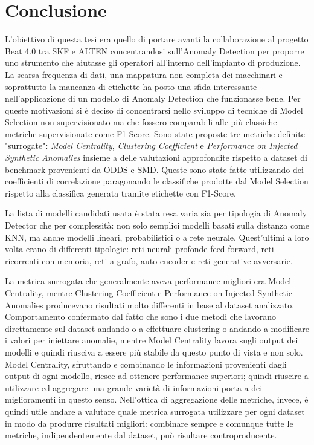 \chapter{Conclusione}
\label{chap:conclusion}
L'obiettivo di questa tesi era quello di portare avanti la collaborazione al progetto Beat 4.0 tra SKF e ALTEN concentrandosi sull'Anomaly Detection per proporre uno strumento che aiutasse gli operatori all'interno dell'impianto di produzione. La scarsa frequenza di dati, una mappatura non completa dei macchinari e soprattutto la mancanza di etichette ha posto una sfida interessante nell'applicazione di un modello di Anomaly Detection che funzionasse bene.
Per queste motivazioni si è deciso di concentrarsi nello sviluppo di tecniche di Model Selection non supervisionato ma che fossero comparabili alle più classiche metriche supervisionate come F1-Score.
Sono state proposte tre metriche definite "surrogate": \textit{Model Centrality}, \textit{Clustering Coefficient} e \textit{Performance on Injected Synthetic Anomalies} insieme a delle valutazioni approfondite rispetto a dataset di benchmark provenienti da ODDS e SMD. Queste sono state fatte utilizzando dei coefficienti di correlazione paragonando le classifiche prodotte dal Model Selection rispetto alla classifica generata tramite etichette con F1-Score.

La lista di modelli candidati usata è stata resa varia sia per tipologia di Anomaly Detector che per complessità: non solo semplici modelli basati sulla distanza come KNN, ma anche modelli lineari, probabilistici o a rete neurale. Quest'ultimi a loro volta erano di differenti tipologie: reti neurali profonde feed-forward, reti ricorrenti con memoria, reti a grafo, auto encoder e reti generative avversarie.

La metrica surrogata che generalmente aveva performance migliori era Model Centrality, mentre Clustering Coefficient e Performance on Injected Synthetic Anomalies producevano risultati molto differenti in base al dataset analizzato. Comportamento confermato dal fatto che sono i due metodi che lavorano direttamente sul dataset andando o a effettuare clustering o andando a modificare i valori per iniettare anomalie, mentre Model Centrality lavora sugli output dei modelli e quindi riusciva a essere più stabile da questo punto di vista e non solo. Model Centrality, sfruttando e combinando le informazioni provenienti dagli output di ogni modello, riesce ad ottenere performance superiori; quindi riuscire a utilizzare ed aggregare una grande varietà di informazioni porta a dei miglioramenti in questo senso.
Nell'ottica di aggregazione delle metriche, invece, è quindi utile andare a valutare quale metrica surrogata utilizzare per ogni dataset in modo da produrre risultati migliori: combinare sempre e comunque tutte le metriche, indipendentemente dal dataset, può risultare controproducente.

